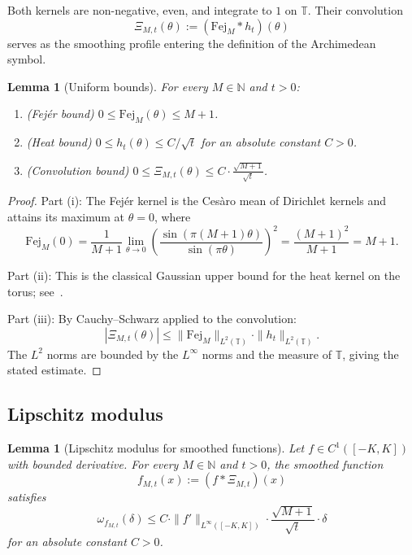 \documentclass[11pt,a4paper]{article}
\newtheorem{lemma}[theorem]{Lemma}
\theoremstyle{definition}
\theoremstyle{remark}
\newcommand{\T}{\mathbb{T}}
\newcommand{\N}{\mathbb{N}}
\begin{document}
Both kernels are non-negative, even, and integrate to $1$ on $\T$. Their convolution
\begin{equation}\label{eq:Xi-def}
  \Xi_{M,t}(\theta) := (\mathrm{Fej}_M * h_t)(\theta)
\end{equation}
serves as the smoothing profile entering the definition of the Archimedean symbol.

\begin{lemma}[Uniform bounds]\label{lem:fejer-uniform}
For every $M \in \N$ and $t > 0$:
\begin{enumerate}[label=(\roman*)]
\item (Fej\'er bound) $0 \leq \mathrm{Fej}_M(\theta) \leq M+1$.
\item (Heat bound) $0 \leq h_t(\theta) \leq C/\sqrt{t}$ for an absolute constant $C > 0$.
\item (Convolution bound) $0 \leq \Xi_{M,t}(\theta) \leq C \cdot \frac{\sqrt{M+1}}{\sqrt{t}}$.
\end{enumerate}
\end{lemma}

\begin{proof}
Part (i): The Fej\'er kernel is the Ces\`aro mean of Dirichlet kernels and attains its maximum at $\theta = 0$, where
\[
  \mathrm{Fej}_M(0) = \frac{1}{M+1} \lim_{\theta \to 0} \left( \frac{\sin(\pi(M+1)\theta)}{\sin(\pi\theta)} \right)^2 = \frac{(M+1)^2}{M+1} = M+1.
\]

Part (ii): This is the classical Gaussian upper bound for the heat kernel on the torus; see~\cite[Chapter~2]{SteinShakarchi2003}.

Part (iii): By Cauchy--Schwarz applied to the convolution:
\[
  |\Xi_{M,t}(\theta)| \leq \|\mathrm{Fej}_M\|_{L^2(\T)} \cdot \|h_t\|_{L^2(\T)}.
\]
The $L^2$ norms are bounded by the $L^\infty$ norms and the measure of $\T$, giving the stated estimate.
\end{proof}

\subsection{Lipschitz modulus}

\begin{lemma}[Lipschitz modulus for smoothed functions]\label{lem:fejer-lip}
Let $f \in C^1([-K, K])$ with bounded derivative. For every $M \in \N$ and $t > 0$, the smoothed function
\[
  f_{M,t}(x) := (f * \Xi_{M,t})(x)
\]
satisfies
\begin{equation}\label{eq:fejer-lip-bound}
  \omega_{f_{M,t}}(\delta) \leq C \cdot \|f'\|_{L^\infty([-K,K])} \cdot \frac{\sqrt{M+1}}{\sqrt{t}} \cdot \delta
\end{equation}
for an absolute constant $C > 0$.
\end{lemma}
\end{document}
